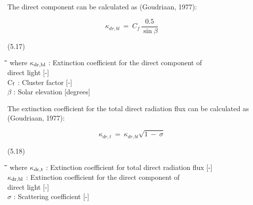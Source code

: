 The direct component can be calculated as (Goudriaan, 1977):

\begin{displaymath}
\kappa _{dr,bl} ~=~{ C _{f} }\,{\frac{0.5}{\sin \beta }}
\end{displaymath}

 
\strut\hfill (5.17)

\nwln
\begin{tabbing}
\hspace{1.27cm}\=\hspace{1.27cm}\=\hspace{1.27cm}\=\hspace{1.27cm}\=%
\hspace{1.27cm}\=\hspace{1.27cm}\=\hspace{1.27cm}\=\hspace{1.27cm}\=%
\hspace{1.27cm}\=\hspace{1.27cm}\=\kill
where $\kappa$$_{{\rm dr,bl}}$ : Extinction coefficient for the direct component of \\
   direct light        [-] \\
C$_{{\rm f}}$ : Cluster factor        [-]\\
$\beta$ : Solar elevation        [degrees]
\end{tabbing}



The extinction coefficient for the total direct radiation flux can be calculated as
{\nobreak}(Goudriaan, 1977):

\begin{displaymath}
\kappa _{dr,t} ~=~ \kappa _{dr,bl} \sqrt{1~-~\sigma }
\end{displaymath}

 
\strut\hfill (5.18)
\nwln
\begin{tabbing}
\hspace{1.27cm}\=\hspace{1.27cm}\=\hspace{1.27cm}\=\hspace{1.27cm}\=%
\hspace{1.27cm}\=\hspace{1.27cm}\=\hspace{1.27cm}\=\hspace{1.27cm}\=%
\hspace{1.27cm}\=\hspace{1.27cm}\=\kill
where $\kappa$$_{{\rm dr,t}}$ : Extinction coefficient for total direct radiation flux        [-]\\
$\kappa$$_{{\rm dr,bl}}$ : Extinction coefficient for the direct component of \\
   direct light        [-]\\
 $\sigma$ : Scattering coefficient         [-]
\end{tabbing}


